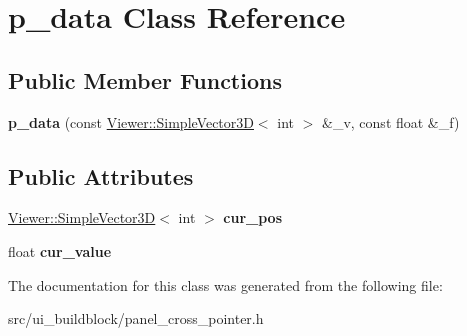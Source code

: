 \hypertarget{classp__data}{}\section{p\+\_\+data Class Reference}
\label{classp__data}
\subsection*{Public Member Functions}
\begin{DoxyCompactItemize}
\item 
\mbox{\label{classp__data_afe078d5fada14791138de11cc25e6332}} 
{\bfseries p\+\_\+data} (const \mbox{\hyperlink{classViewer_1_1SimpleVector3D}{Viewer\+::\+Simple\+Vector3D}}$<$ int $>$ \&\+\_\+v, const float \&\+\_\+f)
\end{DoxyCompactItemize}
\subsection*{Public Attributes}
\begin{DoxyCompactItemize}
\item 
\mbox{\label{classp__data_a74086cad872722b4c6a65d665835c590}} 
\mbox{\hyperlink{classViewer_1_1SimpleVector3D}{Viewer\+::\+Simple\+Vector3D}}$<$ int $>$ {\bfseries cur\+\_\+pos}
\item 
\mbox{\label{classp__data_a24d69b3ec7f90e7b2f812f4340130c27}} 
float {\bfseries cur\+\_\+value}
\end{DoxyCompactItemize}


The documentation for this class was generated from the following file\+:\begin{DoxyCompactItemize}
\item 
src/ui\+\_\+buildblock/panel\+\_\+cross\+\_\+pointer.\+h\end{DoxyCompactItemize}
